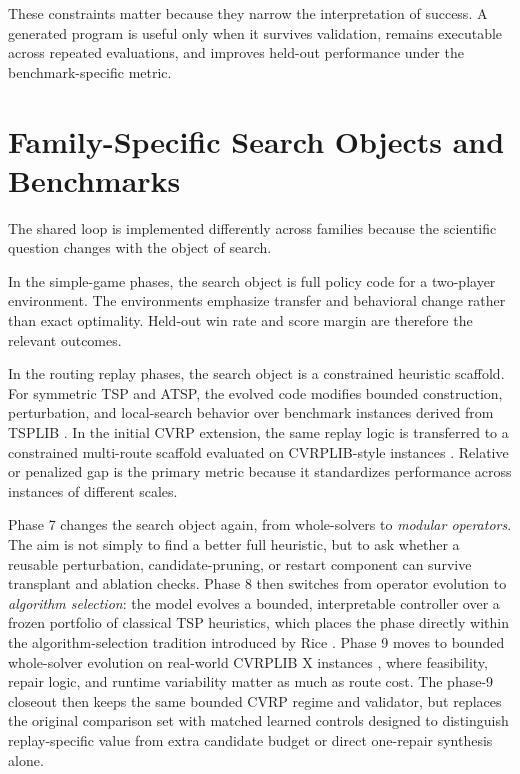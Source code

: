 These constraints matter because they narrow the interpretation of success. A generated program is
useful only when it survives validation, remains executable across repeated evaluations, and
improves held-out performance under the benchmark-specific metric.

\section{Family-Specific Search Objects and Benchmarks}
\label{sec:methods-families}

The shared loop is implemented differently across families because the scientific question changes
with the object of search.

In the simple-game phases, the search object is full policy code for a two-player environment. The
environments emphasize transfer and behavioral change rather than exact optimality. Held-out win
rate and score margin are therefore the relevant outcomes.

In the routing replay phases, the search object is a constrained heuristic scaffold. For symmetric
TSP and ATSP, the evolved code modifies bounded construction, perturbation, and local-search
behavior over benchmark instances derived from TSPLIB \cite{reinelt1991,lin1973,helsgaun2000}. In
the initial CVRP extension, the same replay logic is transferred to a constrained multi-route
scaffold evaluated on CVRPLIB-style instances \cite{clarke1964,uchoa2017}. Relative or penalized
gap is the primary metric because it standardizes performance across instances of different scales.

Phase 7 changes the search object again, from whole-solvers to \emph{modular operators}. The aim
is not simply to find a better full heuristic, but to ask whether a reusable perturbation,
candidate-pruning, or restart component can survive transplant and ablation checks. Phase 8 then
switches from operator evolution to \emph{algorithm selection}: the model evolves a bounded,
interpretable controller over a frozen portfolio of classical TSP heuristics, which places the
phase directly within the algorithm-selection tradition introduced by Rice \cite{rice1976}. Phase
9 moves to bounded whole-solver evolution on real-world CVRPLIB X instances \cite{uchoa2017},
where feasibility, repair logic, and runtime variability matter as much as route cost. The phase-9
closeout then keeps the same bounded CVRP regime and validator, but replaces the original
comparison set with matched learned controls designed to distinguish replay-specific value from
extra candidate budget or direct one-repair synthesis alone.

